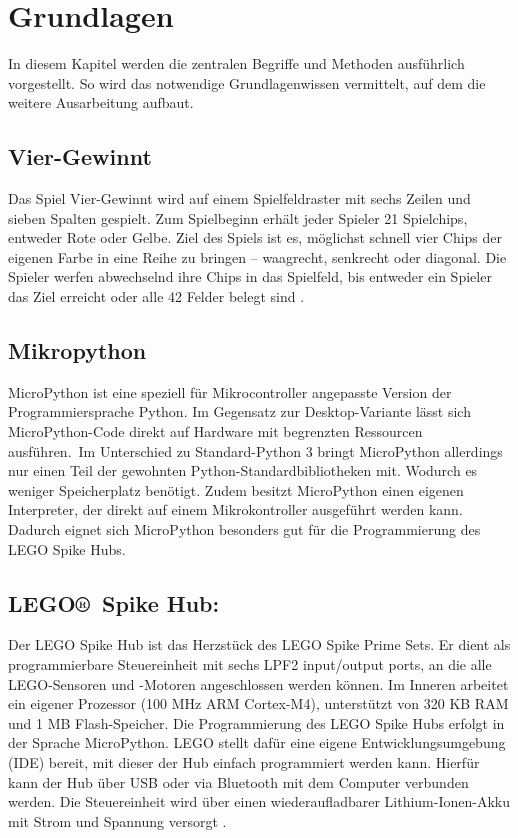 \chapter{Grundlagen}
In diesem Kapitel werden die zentralen Begriffe und Methoden ausführlich vorgestellt. So wird das notwendige Grundlagenwissen vermittelt, auf dem die weitere Ausarbeitung aufbaut.

\section{Vier-Gewinnt}
Das Spiel Vier-Gewinnt wird auf einem Spielfeldraster mit sechs Zeilen und sieben Spalten gespielt. Zum Spielbeginn erhält jeder Spieler 21 Spielchips, entweder Rote oder Gelbe. Ziel des Spiels ist es, möglichst schnell vier Chips der eigenen Farbe in eine Reihe zu bringen – waagrecht, senkrecht oder diagonal. Die Spieler werfen abwechselnd ihre Chips in das Spielfeld, bis entweder ein Spieler das Ziel erreicht oder alle 42 Felder belegt sind \autocite{Hasbro.2020}.

\section{Mikropython}
MicroPython ist eine speziell für Mikrocontroller angepasste Version der Programmiersprache Python. Im Gegensatz zur Desktop-Variante lässt sich MicroPython-Code direkt auf Hardware mit begrenzten Ressourcen ausführen\autocite{energy_responsiveness2023}\autocite{Plauska2023}.\
Im Unterschied zu Standard-Python 3 bringt MicroPython allerdings nur einen Teil der gewohnten Python-Standardbibliotheken mit. Wodurch es weniger Speicherplatz benötigt.
Zudem besitzt MicroPython einen eigenen Interpreter, der direkt auf einem Mikrokontroller ausgeführt werden kann.
Dadurch eignet sich MicroPython besonders gut für die Programmierung des LEGO Spike Hubs\autocite{bell2024micropython}.



\section{LEGO® Spike Hub:}
Der LEGO Spike Hub ist das Herzstück des LEGO Spike Prime Sets. Er dient als programmierbare Steuereinheit mit sechs LPF2 input/output ports, an die alle LEGO-Sensoren und -Motoren angeschlossen werden können. Im Inneren arbeitet ein eigener Prozessor (100 MHz ARM Cortex-M4), unterstützt von 320 KB RAM und 1 MB Flash-Speicher. Die Programmierung des LEGO Spike Hubs erfolgt in der Sprache MicroPython. LEGO stellt dafür eine eigene Entwicklungsumgebung (IDE) bereit, mit dieser der Hub einfach programmiert werden kann. Hierfür kann der Hub über USB oder via Bluetooth mit dem Computer verbunden werden. Die Steuereinheit wird über einen  wiederaufladbarer Lithium-Ionen-Akku mit Strom und Spannung versorgt \autocite{lego2020techniclargehub}.

